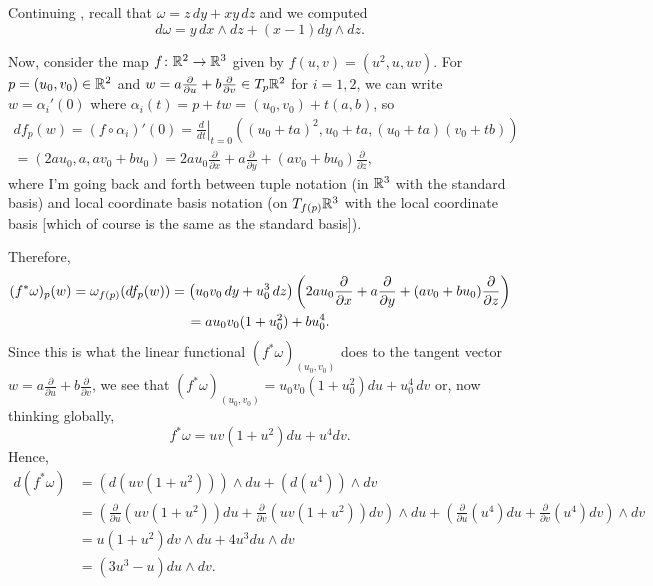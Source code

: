 \begin{example}
	Continuing , recall that $\omega = z \, dy + xy \, dz$ and we computed 
	\[
		d\omega = y\, dx \wedge dz + (x-1) dy \wedge dz.
	\]
	
	Now, consider the map $f \colon\thinspace\! \mathbb{R}^2 \to \mathbb{R}^3$ given by $f(u,v) = (u^2, u, uv)$. For $p = (u_0, v_0) \in \mathbb{R}^2$ and $w = a \frac{\partial}{\partial u} + b \frac{\partial }{\partial v} \in T_p\mathbb{R}^2$ for $i=1,2$, we can write $w = \alpha_i'(0)$ where $\alpha_i(t) = p + tw = (u_0 , v_0) + t(a,b)$, so 
	\begin{multline*}
		df_p(w) = (f \circ \alpha_i)'(0) = \left. \frac{d}{dt}\right|_{t=0} ((u_0 + ta)^2, u_0 + ta, (u_0 + ta)(v_0 + tb)) \\
		= (2au_0, a, av_0 + bu_0) = 2au_0 \frac{\partial}{\partial x} + a \frac{\partial}{\partial y} + (av_0 + bu_0) \frac{\partial}{\partial z},
	\end{multline*}
	where I'm going back and forth between tuple notation (in $\mathbb{R}^3$ with the standard basis) and local coordinate basis notation (on $T_{f(p)} \mathbb{R}^3$ with the local coordinate basis [which of course is the same as the standard basis]). 
	
	Therefore,
	\begin{multline*}
		(f^\ast \omega)_p(w) = \omega_{f(p)}(df_p(w)) = \left(\vphantom{x^2} u_0v_0 \, dy + u_0^3 \, dz\right)\left(2au_0 \frac{\partial}{\partial x} + a \frac{\partial}{\partial y} + (av_0 + bu_0) \frac{\partial}{\partial z}\right) \\
		= a u_0 v_0(1+u_0^2) + b u_0^4.
	\end{multline*}
	Since this is what the linear functional $(f^\ast \omega)_{(u_0,v_0)}$ does to the tangent vector $w=a \frac{\partial}{\partial u} + b \frac{\partial }{\partial v}$, we see that $(f^\ast \omega)_{(u_0,v_0)} = u_0 v_0(1+u_0^2) du + u_0^4\, dv$ or, now thinking globally,
	\[
		f^\ast \omega = u v(1+u^2) du + u^4 dv.
	\]
	Hence,
	\begin{align*}
		d(f^\ast \omega) & = \left(d\left( u v(1+u^2) \right)\right) \wedge du + \left(d\left(u^4 \right)\right)\wedge dv \\
		 & = \left( \frac{\partial}{\partial u}\left( u v(1+u^2) \right) du + \frac{\partial}{\partial v}\left( u v(1+u^2) \right) dv\right) \wedge du + \left( \frac{\partial}{\partial u}\left(u^4\right) du + \frac{\partial}{\partial v}\left(u^4\right)dv \right) \wedge dv \\
		 & = u(1+u^2) dv \wedge du + 4u^3 du \wedge dv \\
		 & = (3u^3-u) du \wedge dv.
	\end{align*}
	

\end{example}
